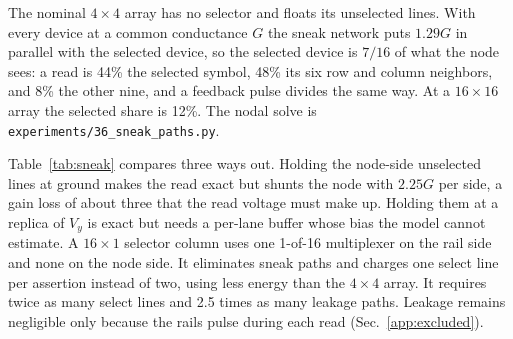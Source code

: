 \documentclass[reprint,amsmath,amssymb,aps,nofootinbib]{revtex4-2}
\begin{document}
The nominal $4 \times 4$ array has no selector and floats its
unselected lines. With every device at a common conductance $G$ the
sneak network puts $1.29G$ in parallel with the selected device, so
the selected device is $7/16$ of what the node sees: a read is 44\%
the selected symbol, 48\% its six row and column neighbors, and 8\%
the other nine, and a feedback pulse divides the same way. At a
$16 \times 16$ array the selected share is 12\%. The nodal solve is
\texttt{experiments/36\_sneak\_paths.py}.

Table~\ref{tab:sneak} compares three ways out. Holding the node-side
unselected lines at ground makes the read exact but shunts the node
with $2.25G$ per side, a gain loss of about three that the read
voltage must make up. Holding them at a replica of $V_y$ is exact but
needs a per-lane buffer whose bias the model cannot estimate. A $16 \times 1$ selector column uses one 1-of-16 multiplexer on the rail
side and none on the node side. It eliminates sneak paths and charges
one select line per assertion instead of two, using less energy than the
$4 \times 4$ array. It requires twice as many select lines and 2.5 times
as many leakage paths. Leakage remains negligible only because the rails
pulse during each read (Sec.~\ref{app:excluded}).
\end{document}
